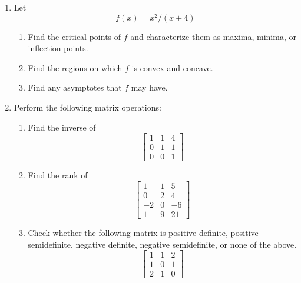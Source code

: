 \documentclass[11pt]{article}
\begin{document}
\begin{enumerate}
\vspace{.2in}
\item Let $$f(x)=x^2/(x+4)$$
\begin{enumerate}
\item Find the critical points of $f$ and characterize them as maxima, minima, or inflection points.
\item Find the regions on which $f$ is convex and concave.
\item Find any asymptotes that $f$ may have.

\end{enumerate}

\item Perform the following matrix operations:

\begin{enumerate}
\item Find the inverse of $$\begin{bmatrix}1 & 1& 4\\ 0& 1& 1\\0&0&1
\end{bmatrix}$$

\item Find the rank of 
$$\begin{bmatrix} 
1& 1& 5\\
0& 2& 4\\
-2& 0& -6\\
1& 9& 21
\end{bmatrix}$$


\item Check whether the following matrix is positive definite, positive semidefinite, negative definite, negative semidefinite, or none of the above.
$$\begin{bmatrix}
1& 1& 2\\1& 0& 1\\2& 1& 0
\end{bmatrix}$$
\end{enumerate}


\end{enumerate}
\end{document}
